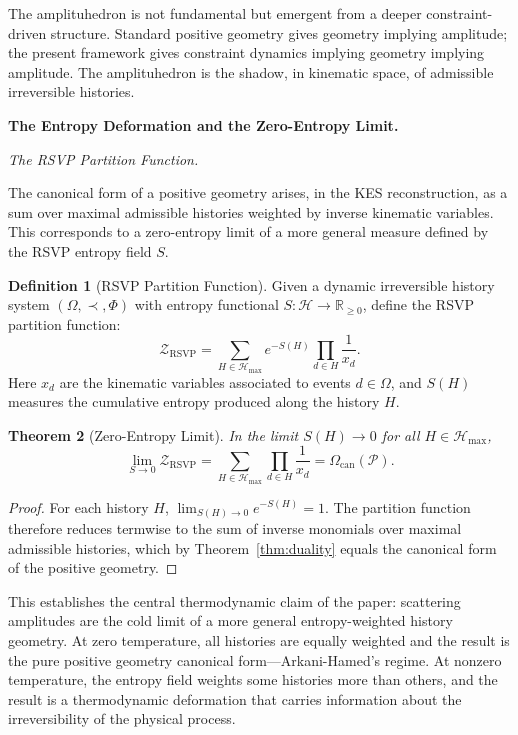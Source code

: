 \documentclass[11pt]{article}
\theoremstyle{plain}
\newtheorem{theorem}{Theorem}[section]
\theoremstyle{definition}
\newtheorem{definition}[theorem]{Definition}
\theoremstyle{remark}
\newcommand{\R}{\mathbb{R}}
\newcommand{\Phif}{\Phi}
\newcommand{\Sf}{S}
\newcommand{\OmKS}{\Omega}
\newcommand{\CF}{\Omega_{\mathrm{can}}}
\newcommand{\ZRSVP}{\mathcal{Z}_{\mathrm{RSVP}}}
\newcommand{\Hmax}{\mathcal{H}_{\max}}
\begin{document}
The amplituhedron is not fundamental but emergent from a deeper constraint-driven structure. Standard positive geometry gives geometry implying amplitude; the present framework gives constraint dynamics implying geometry implying amplitude. The amplituhedron is the shadow, in kinematic space, of admissible irreversible histories.

\bigskip\noindent\textbf{The Entropy Deformation and the Zero-Entropy Limit.}
\label{sec:entropy}

\medskip\noindent\textit{The RSVP Partition Function.}

The canonical form of a positive geometry arises, in the KES reconstruction, as a sum over maximal admissible histories weighted by inverse kinematic variables. This corresponds to a zero-entropy limit of a more general measure defined by the RSVP entropy field $\Sf$.

\begin{definition}[RSVP Partition Function]
Given a dynamic irreversible history system $(\OmKS, \prec, \Phif)$ with entropy functional $\Sf: \mathcal{H} \to \R_{\geq 0}$, define the RSVP partition function:
\begin{equation}
\label{eq:rsvp-partition}
  \ZRSVP = \sum_{H \in \Hmax} e^{-\Sf(H)} \prod_{d \in H} \frac{1}{x_d}.
\end{equation}
Here $x_d$ are the kinematic variables associated to events $d \in \OmKS$, and $\Sf(H)$ measures the cumulative entropy produced along the history $H$.
\end{definition}

\begin{theorem}[Zero-Entropy Limit]
\label{thm:zero-entropy}
In the limit $\Sf(H) \to 0$ for all $H \in \Hmax$,
\[
  \lim_{\Sf \to 0} \ZRSVP = \sum_{H \in \Hmax} \prod_{d \in H} \frac{1}{x_d} = \CF(\mathcal{P}).
\]
\end{theorem}

\begin{proof}
For each history $H$, $\lim_{\Sf(H) \to 0} e^{-\Sf(H)} = 1$. The partition function therefore reduces termwise to the sum of inverse monomials over maximal admissible histories, which by Theorem~\ref{thm:duality} equals the canonical form of the positive geometry.
\end{proof}

This establishes the central thermodynamic claim of the paper: scattering amplitudes are the cold limit of a more general entropy-weighted history geometry. At zero temperature, all histories are equally weighted and the result is the pure positive geometry canonical form---Arkani-Hamed's regime. At nonzero temperature, the entropy field weights some histories more than others, and the result is a thermodynamic deformation that carries information about the irreversibility of the physical process.
\end{document}
